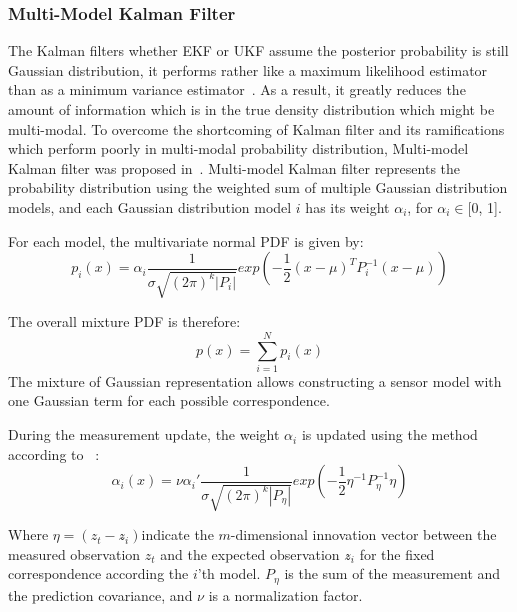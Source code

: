 \subsubsection{Multi-Model Kalman Filter}\label{sub:mmkalman}
The Kalman filters whether \gls{EKF} or \gls{UKF} assume the posterior probability is still Gaussian distribution, it performs rather like a maximum likelihood estimator than as a minimum variance estimator~\cite{alspach1972nonlinear}. As a result, it greatly reduces the amount of information which is in the true density distribution which might be multi-modal. To overcome the shortcoming of Kalman filter and its ramifications which perform poorly in multi-modal probability distribution, Multi-model Kalman filter was proposed in~\cite{alspach1972nonlinear}. Multi-model Kalman filter represents the probability distribution using the weighted sum of multiple Gaussian distribution models, and each Gaussian distribution model $i$ has its weight $\alpha_i$, for $\alpha_i \in $[0, 1].

For each model, the multivariate normal \gls{PDF} is given by:
\begin{equation}
\label{eq:mmkalman}
p_{i}(x) = \alpha_i\frac{1}{\sigma \sqrt {(2\pi)^k|P_i|}}exp(-\frac{1}{2}(x-\mu)^TP_i^{-1}(x-\mu))
\end{equation}

The overall mixture \gls{PDF} is therefore:
\begin{equation}
\label{eq:mmkalmansum}
p(x) = \sum_{i=1}^{N}p_i(x)
\end{equation}
The mixture of Gaussian representation allows constructing a sensor model with one Gaussian term for each possible correspondence.

During the measurement update, the weight $\alpha_i$ is updated using the method according to ~\cite{alspach1972nonlinear}:
\begin{equation}
\label{eq:weightupdate}
\alpha_{i}(x) = \nu\alpha_i'\frac{1}{\sigma \sqrt {(2\pi)^k|P_\eta|}}exp(-\frac{1}{2}\eta^{-1}P_\eta^{-1}\eta)
\end{equation}

Where $\eta = (z_t - z\widehat{}_i)$indicate the $m$-dimensional innovation vector between the measured observation $z_t$ and the expected observation $z\widehat{}_i$ for the fixed correspondence according the $i$'th model. $P_\eta$ is the sum of the measurement and the prediction covariance, and $\nu$ is a normalization factor.

